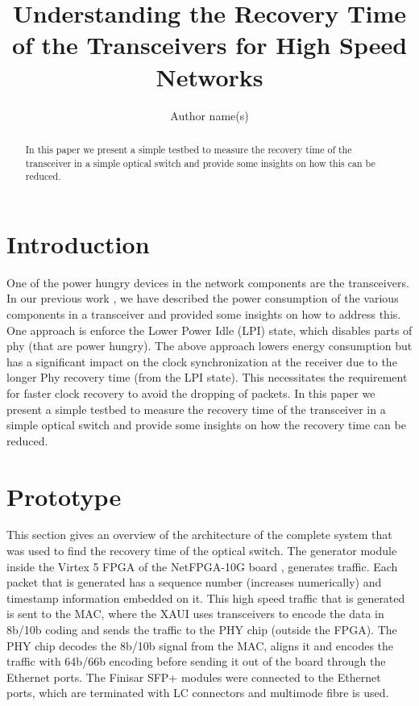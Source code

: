 \documentclass[letterpaper,10pt]{article}
\begin{document}
\title{Understanding the Recovery Time of the Transceivers for High Speed Networks}

\author{Author name(s)}
\address{The Computer Laboratory, 15 , JJ Thomson Avenue, Cambridge, CB3 0FD}

\begin{abstract}
In this paper we present a simple testbed to measure the recovery time of the transceiver 
in a simple optical switch and provide some insights on how this can be reduced.
\end{abstract}



\section{Introduction}

One of the power hungry devices in the network components are the transceivers. In our previous
work \cite{yury}, we have described the power consumption of the various components in a transceiver and provided some insights on
how to address this. One approach is enforce the Lower Power Idle (LPI) state, which disables parts of phy 
(that are power hungry). The above approach lowers energy consumption but has a significant impact on the clock 
synchronization at the receiver due to the longer Phy recovery time (from the LPI state). This necessitates the 
requirement for faster clock recovery to avoid the dropping of packets.  In this paper we present a 
simple testbed to measure the recovery time of the transceiver in a simple optical switch and provide some 
insights on how the recovery time can be reduced.        


\section{Prototype}

This section gives an overview of the architecture of the complete system that was used to find 
the recovery time of the optical switch. The generator module inside the Virtex 5 FPGA of the NetFPGA-10G board \cite{blott}, generates traffic. Each packet that is generated has a sequence number (increases numerically)
and timestamp information embedded on it. This high speed traffic that is generated is sent to 
the MAC, where the XAUI uses transceivers to encode the data in 8b/10b coding and sends the 
traffic to the PHY chip (outside the FPGA). The PHY chip decodes the 8b/10b signal from the 
MAC, aligns it and encodes the traffic with 64b/66b encoding before sending it out of the board 
through the Ethernet ports. The Finisar SFP+ modules were connected to the Ethernet ports, 
which are terminated with LC connectors and multimode fibre is used. 
\end{document}
